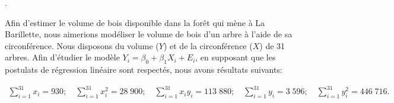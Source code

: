 \begin{questions}

\newpage
.
\newpage
\question\label{rls}

Afin d'estimer le volume de bois disponible dans la forêt qui mène à La Barillette, nous aimerions modéliser le volume de bois d'un arbre à l'aide de sa circonférence. Nous disposons du volume ($Y$) et de la circonférence ($X$) de 31 arbres. Afin d'étudier le modèle $Y_i = \beta_0 + \beta_1 X_i + E_i$, en supposant que les postulats de régression linéaire sont respectés, nous avons résultats suivants:

\begin{align*}
	\sum_{i=1}^{31} x_i = 930;  \quad \sum_{i=1}^{31} x_i^2 = 28\;900 ; \quad \sum_{i=1}^{31} x_iy_i =113\;880;\quad
	\sum_{i=1}^{31} y_i = 3\;596; \quad \sum_{i=1}^{31} y_i^2 = 446\;716.
\end{align*}

\end{questions}
